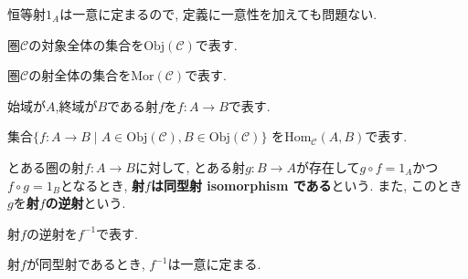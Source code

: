 \begin{caution}
恒等射$1_{A}$は一意に定まるので, 定義に一意性を加えても問題ない.
\end{caution}
\begin{Notation}
圏$\mathscr{C}$の対象全体の集合を$\mathrm{Obj}(\mathscr{C})$で表す.
\end{Notation}
\begin{Notation}
圏$\mathscr{C}$の射全体の集合を$\mathrm{Mor}(\mathscr{C})$で表す.
\end{Notation}

\begin{Notation}
始域が$A$,終域が$B$である射$f$を$f:A\rightarrow B$で表す.
\end{Notation}
\begin{Notation}
集合$\{f:A\rightarrow B\mid A\in\mathrm{Obj}(\mathscr{C}), B\in\mathrm{Obj}(\mathscr{C})\}$
を$\mathrm{Hom}_{\mathscr{C}}(A,B)$で表す.
\end{Notation}
\begin{Def}
とある圏の射$f:A\rightarrow B$に対して,
とある射$g:B\rightarrow A$が存在して$g\circ f=1_A$かつ$f\circ g=1_B$となるとき,
{\bf 射$f$は同型射 isomorphism である}という. また, このとき$g$を{\bf 射$f$の逆射}という.
\end{Def}
\begin{Notation}
射$f$の逆射を$f^{-1}$で表す.
\end{Notation}
\begin{Prop}
射$f$が同型射であるとき, $f^{-1}$は一意に定まる.
\end{Prop}
\begin{comment}
\begin{proof}
\end{proof}
\end{comment}

\begin{comment}
\subsection{情報隠蔽された対象の探究に圏論が提供する方法論}
オブジェクト指向プログラミングでは,「知らせる必要のない情報は隠蔽しておくほうが安全である」という{\bf 情報隠蔽}の考え方が重要視される.
これに対して, 圏論は, 対象がもつ情報が隠蔽されている状況下で, 射のみから対象について探究するという方法論を提供する.
\begin{example}
どのような要素をもつかわからない集合$A$について写像$f:A\rightarrow A$が定義されていて$f\circ f\circ f$が恒等写像になるとする.
このとき$A$が3つの要素$a_1,a_2,a_3$をもつと仮定することができ,
\[
f(a_1)=a_2, f(a_2)=a_3, 
f(a_3)=a_1
\]
というように, これらの要素が写像$f$によって回転していると考えることができる.
\end{example}
\end{comment}
